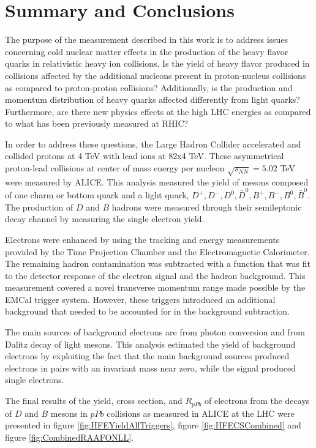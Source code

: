 \chapter{Summary and Conclusions} \label{ch:conclusions}

The purpose of the measurement described in this work is to address issues concerning cold nuclear matter effects in the production of the heavy flavor quarks in relativistic heavy ion collisions. Is the yield of heavy flavor produced in collisions affected by the additional nucleons present in proton-nucleus collisions as compared to proton-proton collisions? Additionally, is the production and momentum distribution of heavy quarks affected differently from light quarks? Furthermore, are there new physics effects at the high LHC energies as compared to what has been previously measured at RHIC?

In order to address these questions, the Large Hadron Collider accelerated and collided protons at 4 TeV with lead ions at 82x4 TeV. These asymmetrical proton-lead collisions at center of mass energy per nucleon $\sqrt{s_{NN}} = 5.02$ TeV were measured by ALICE. This analysis measured the yield of mesons composed of one charm or bottom quark and a light quark, $D^+ , D^- , D^0 , \bar D^0, B^+ , B^- , B^0 , \bar B^0$. The production of $D$ and $B$ hadrons were measured through their semileptonic decay channel by measuring the single electron yield. 

Electrons were enhanced by using the tracking and energy measurements provided by the Time Projection Chamber and the Electromagnetic Calorimeter. The remaining hadron contamination was subtracted with a function that was fit to the detector response of the electron signal and the hadron background. This measurement covered a novel transverse momentum range made possible by the EMCal trigger system. However, these triggers introduced an additional background that needed to be accounted for in the background subtraction. 

The main sources of background electrons are from photon conversion and from Dalitz decay of light mesons. This analysis estimated the yield of background electrons by exploiting the fact that the main background sources produced electrons in pairs with an invariant mass near zero, while the signal produced single electrons. 

The final results of the yield, cross section, and $R_{pPb}$ of electrons from the decays of $D$ and $B$ mesons in $pPb$ collisions as measured in ALICE at the LHC were presented in figure \ref{fig:HFEYieldAllTriggers}, figure \ref{fig:HFECSCombined} and figure \ref{fig:CombinedRAAFONLL}.

